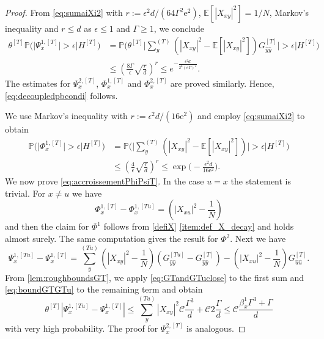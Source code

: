 \documentclass[11pt]{article}
\newcommand{\ee}{\mathrm{e}}
\newcommand{\abs}[1]{\left| #1 \right|}
\theoremstyle{plain}
\theoremstyle{remark}
\numberwithin{equation}{section}
\newcommand*\bset[1]{[#1]}
\newcommand*\ubarr[1]{{\widehat{#1}}}
\begin{document}
	\begin{proof}
From \cref{eq:sumaiXi2} with $r:= \epsilon^2 d/(64 \Gamma^2 \ee^2)$, $\mathbb{E}[\abs{X_{xy}}^2]  = 1/N$, Markov's inequality 
		and $r \leq d$ as $\epsilon \leq 1$ and $\Gamma \geq 1$, 
		we conclude  
		\begin{align*}
			\theta^{\bset{T}} \mathbb{P} \big( \big|\Psi_x^{1,\bset{T}}\big| > \epsilon \big| H^{\bset{T}} \big) &= \mathbb{P} \biggl(\theta^{\bset{T}} \biggl| \sum_{y}^{(T)} \left( \abs{X_{xy}}^2 - \mathbb{E}[\abs{X_{xy}}^2]\right) G_{\ubarr{y}\ubarr{y}}^{\bset{T}}\biggr| > \epsilon \bigg| H^{\bset{T}} \biggr) \\
			&\le \left( \frac{8 \Gamma}{\epsilon} \sqrt{\frac{r}{d}} \right)^r \le e^{-\frac{ \epsilon^2 d}{2^6(e\Gamma)^2}}.
		\end{align*}
		The estimates for $\Psi_x^{2,\bset{T}}$, $\Phi_x^{1,\bset{T}}$ and $\Phi_x^{2,\bset{T}}$ are proved similarly.
		Hence, \cref{eq:decoupledpbcondi} follows. 
		
		We use Markov's inequality with $r:= \epsilon^2d/(16 \ee^2)$ and employ \cref{eq:sumaiXi2} to obtain 
			\begin{align*}
			\mathbb{P} \big( \big|\Phi_x^{1,\bset{T}}\big| > \epsilon \big| H^{\bset{T}} \big) &= \mathbb{P} \biggl(\biggl| \sum_{y}^{(T)} \left( \abs{X_{xy}}^2 - \mathbb{E}[\abs{X_{xy}}^2]\right) \biggr| > \epsilon \bigg| H^{\bset{T}} \biggr) \\
			&\le \left( \frac{4}{\epsilon} \sqrt{\frac{r}{d}} \right)^r \le \exp\bigg(- \frac{\epsilon^2 d}{16\ee^2}\bigg).
		\end{align*}
		We now prove \cref{eq:accroissementPhiPsiT}. In the case $u =x$ the statement is trivial. For $x \neq u$ we have
		\begin{equation*}
			\Phi^{1,\bset{T}}_{x} - \Phi^{1,\bset{Tu}}_x =  \left( \abs{X_{xu}}^2 - \frac{1}{N}\right)
		\end{equation*}
		and then the claim for $\Phi^1$ follows from \cref{defiX} \cref{item:def_X_decay} and holds almost surely. The same computation gives the result for $\Phi^2$. Next we have 
		\begin{equation*}
			\Psi_{x}^{1,\bset{Tu}} - \Psi_{x}^{1,\bset{T}} = \sum_{y}^{(Tu)} \left( \abs{X_{xy}}^2 - \frac{1}{N} \right) (G_{\ubarr{y}\ubarr{y}}^{\bset{Tu}} -G_{\ubarr{y}\ubarr{y}}^{\bset{T}}) - \left( \abs{X_{xu}}^2 - \frac{1}{N} \right)G_{\ubarr{u}\ubarr{u}}^{\bset{T}}.
		\end{equation*}
		From \cref{lem:roughboundsGT}, we apply \cref{eq:GTandGTuclose} to the first sum and \cref{eq:boundGTGTu} to the remaining term and obtain
		\begin{equation*}
			\theta^{\bset{T}} \abs{\Psi_x^{1,\bset{Tu}} - \Psi_x^{1,\bset{T}}} \le \sum_{y}^{(Tu)}\abs{X_{xy}}^2 \mathcal{C}\frac{\Gamma^3}{d} + \mathcal{C}2 \frac{\Gamma}{d}  \le \mathcal{C} \frac{ \beta_{x}^1 \Gamma^3+ \Gamma}{d}
		\end{equation*}
		with very high probability. The proof for $\Psi_x^{2,\bset{T}}$ is analogous.
	\end{proof}
\end{document}
